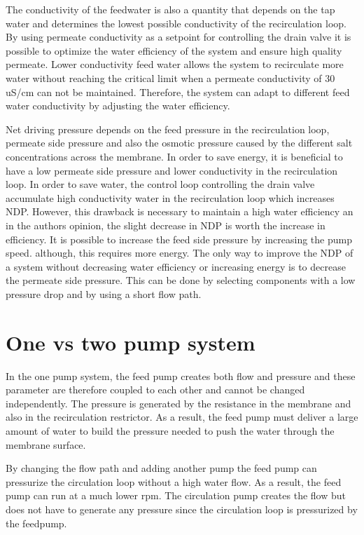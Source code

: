 The conductivity of the feedwater is also a quantity that depends on the tap water and determines the lowest possible conductivity of the recirculation loop. By using permeate conductivity as a setpoint for controlling the drain valve it is possible to optimize the water efficiency of the system and ensure high quality permeate. Lower conductivity feed water allows the system to recirculate more water without reaching the critical limit when a permeate conductivity of 30 uS/cm can not be maintained. Therefore, the system can adapt to different feed water conductivity by adjusting the water efficiency.

Net driving pressure depends on the feed pressure in the recirculation loop, permeate side pressure and also the osmotic pressure caused by the different salt concentrations across the membrane. In order to save energy, it is beneficial to have a low permeate side pressure and lower conductivity in the recirculation loop. In order to save water, the control loop controlling the drain valve accumulate high conductivity water in the recirculation loop which increases NDP. However, this drawback is necessary to maintain a high water efficiency an in the authors opinion, the slight decrease in NDP is worth the increase in efficiency. It is possible to increase the feed side pressure by increasing the pump speed. although, this requires more energy. The only way to improve the NDP of a system without decreasing water efficiency or increasing energy is to decrease the permeate side pressure. This can be done by selecting components with a low pressure drop and by using a short flow path.

\section{One vs two pump system}

In the one pump system, the feed pump creates both flow and pressure and these parameter are therefore coupled to each other and cannot be changed independently. The pressure is generated by the resistance in the membrane and also in the recirculation restrictor. As a result, the feed pump must deliver a large amount of water to build the pressure needed to push the water through the membrane surface. 

By changing the flow path and adding another pump the feed pump can pressurize the circulation loop without a high water flow. As a result, the feed pump can run at a much lower rpm. The circulation pump creates the flow but does not have to generate any pressure since the circulation loop is pressurized by the feedpump.

